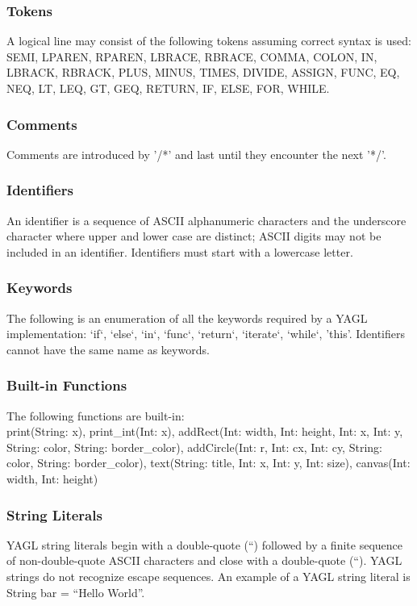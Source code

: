 \documentclass[12pt]{article}
\begin{document}
\subsubsection{Tokens}
A logical line may consist of the following tokens assuming correct syntax is used: \\
SEMI, LPAREN, RPAREN, LBRACE, RBRACE, COMMA, COLON, IN, LBRACK, RBRACK, PLUS, MINUS, TIMES, DIVIDE, ASSIGN, FUNC, EQ, NEQ, LT, LEQ, GT, GEQ, RETURN, IF, ELSE, FOR, WHILE. 

\subsubsection{Comments} 
Comments are introduced by '/*' and last until they encounter the next '*/'.

\subsubsection{Identifiers}
An identifier is a sequence of ASCII alphanumeric characters and the underscore character where upper and lower case are distinct; ASCII digits may not be included in an identifier.  Identifiers must start with a lowercase letter.

\subsubsection{Keywords}
The following is an enumeration of all the keywords required by a YAGL implementation:
`if`, `else`, `in`, `func`, `return`, `iterate`, `while`, 'this'.  Identifiers cannot have the same name as keywords.

\subsubsection{Built-in Functions}
The following functions are built-in:\\
print(String: x), print\_int(Int: x), addRect(Int: width, Int: height, Int: x, Int: y, String: color, String: border\_color), addCircle(Int: r, Int: cx, Int: cy, String: color, String: border\_color), text(String: title, Int: x, Int: y, Int: size), canvas(Int: width, Int: height)

\subsubsection{String Literals}
YAGL string literals begin with a double-quote (“) followed by a finite sequence of non-double-quote ASCII characters and close with a double-quote (“). YAGL strings do not recognize escape sequences. An example of a YAGL string literal is String bar = “Hello World”.
\end{document}
